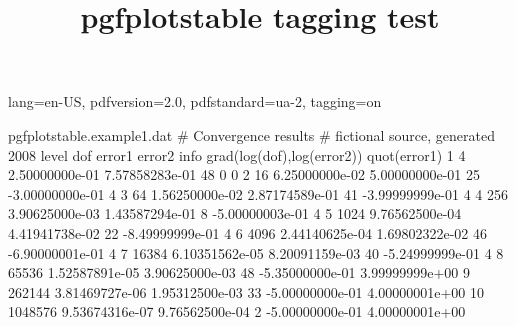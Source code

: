 \ifdefined\Uchar\RequirePackage{luatagging}\fi
\DocumentMetadata
  {
    lang=en-US,
    pdfversion=2.0,
    pdfstandard=ua-2,
    tagging=on
  }
\begin{filecontents*}{pgfplotstable.example1.dat}
# Convergence results
# fictional source, generated 2008
level dof error1 error2 info grad(log(dof),log(error2)) quot(error1)
1 4 2.50000000e-01 7.57858283e-01 48 0 0
2 16 6.25000000e-02 5.00000000e-01 25 -3.00000000e-01 4
3 64 1.56250000e-02 2.87174589e-01 41 -3.99999999e-01 4
4 256 3.90625000e-03 1.43587294e-01 8 -5.00000003e-01 4
5 1024 9.76562500e-04 4.41941738e-02 22 -8.49999999e-01 4
6 4096 2.44140625e-04 1.69802322e-02 46 -6.90000001e-01 4
7 16384 6.10351562e-05 8.20091159e-03 40 -5.24999999e-01 4
8 65536 1.52587891e-05 3.90625000e-03 48 -5.35000000e-01 3.99999999e+00
9 262144 3.81469727e-06 1.95312500e-03 33 -5.00000000e-01 4.00000001e+00
10 1048576 9.53674316e-07 9.76562500e-04 2 -5.00000000e-01 4.00000001e+00
\end{filecontents*}

\documentclass{article}
\usepackage{pgfplotstable,booktabs}
\pgfplotsset{compat=newest}
\ifdefined\Uchar\usepackage{lua-unicode-math}\fi

\title{pgfplotstable tagging test}




\bigskip

         

